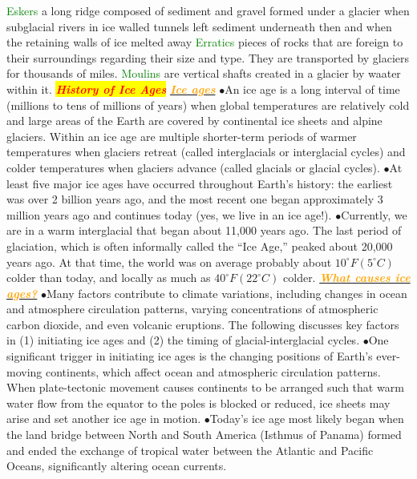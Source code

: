 \documentclass{article}
\newcommand{\ddd}{$\bullet$}
\newcommand{\red}[1]{\textcolor{red}{#1}}
\newcommand{\green}[1]{\textcolor{green}{#1}}
\newcommand{\orange}[1]{\textcolor{orange}{#1}}
\newcommand{\mysection}[1]{\colorbox{yellow}{{\textbf{\textbf{\textit{\red{#1}}}}}}}
\newcommand{\mysub}[1]{\underline{\textbf{{\textit{\orange{#1}}}}}}
\newcommand{\mysubsub}[1]{{{\green{#1}}}}
\begin{document}
\begin{multicols*}{4}
			\mysubsub{Eskers} a long ridge composed of sediment and gravel formed under a glacier when subglacial rivers in ice walled tunnels left sediment underneath then and when the retaining walls of ice melted away
			\mysubsub{Erratics} pieces of rocks that are foreign to their surroundings regarding their size and type. They are transported by glaciers for thousands of miles.
			\mysubsub{Moulins} are vertical shafts created in a glacier by waater within it.
        \mysection{History of Ice Ages}
            \mysub{Ice ages}
                \ddd An ice age is a long interval of time (millions to tens of millions of years) when global temperatures are relatively cold and large areas of the Earth are covered by continental ice sheets and alpine glaciers. Within an ice age are multiple shorter-term periods of warmer temperatures when glaciers retreat (called interglacials or interglacial cycles) and colder temperatures when glaciers advance (called glacials or glacial cycles).
                \ddd At least five major ice ages have occurred throughout Earth’s history: the earliest was over 2 billion years ago, and the most recent one began approximately 3 million years ago and continues today (yes, we live in an ice age!).
                \ddd Currently, we are in a warm interglacial that began about 11,000 years ago. The last period of glaciation, which is often informally called the “Ice Age,” peaked about 20,000 years ago. At that time, the world was on average probably about $ 10^\circ F (5^\circ C) $ colder than today, and locally as much as $ 40^\circ F (22^\circ C) $ colder.
            \mysub{What causes ice ages?}
                \ddd Many factors contribute to climate variations, including changes in ocean and atmosphere circulation patterns, varying concentrations of atmospheric carbon dioxide, and even volcanic eruptions. The following discusses key factors in (1) initiating ice ages and (2) the timing of glacial-interglacial cycles.
                \ddd One significant trigger in initiating ice ages is the changing positions of Earth’s ever-moving continents, which affect ocean and atmospheric circulation patterns. When plate-tectonic movement causes continents to be arranged such that warm water flow from the equator to the poles is blocked or reduced, ice sheets may arise and set another ice age in motion.
                \ddd Today’s ice age most likely began when the land bridge between North and South America (Isthmus of Panama) formed and ended the exchange of tropical water between the Atlantic and Pacific Oceans, significantly altering ocean currents.

\end{multicols*}
\end{document}
